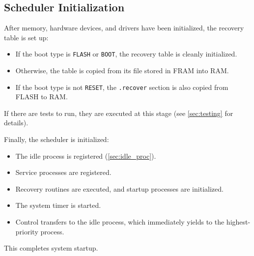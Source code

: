 \subsection{Scheduler Initialization}

After memory, hardware devices, and drivers have been initialized, the recovery table
is set up:
\begin{itemize}
    \item If the boot type is \lstinline[style=myagc]|FLASH| or
        \lstinline[style=myagc]|BOOT|, the recovery table is cleanly initialized.
    \item Otherwise, the table is copied from its file stored in FRAM into RAM.
    \item If the boot type is not \lstinline[style=myagc]|RESET|, the
        \lstinline[style=myagc]|.recover| section is also copied from FLASH to RAM.
\end{itemize}

If there are tests to run, they are executed at this stage (see \autoref{sec:testing}
for details).

Finally, the scheduler is initialized:
\begin{itemize}
    \item The idle process is registered (\autoref{sec:idle_proc}).
    \item Service processes are registered.
    \item Recovery routines are executed, and startup processes are initialized.
    \item The system timer is started.
    \item Control transfers to the idle process, which immediately yields to the
        highest-priority process.
\end{itemize}
This completes system startup.


